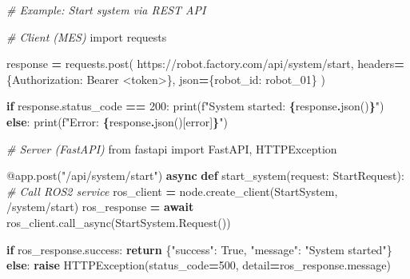 \documentclass[
]{article}
\newenvironment{Shaded}{\begin{snugshade}}{\end{snugshade}}
\newcommand{\AttributeTok}[1]{\textcolor[rgb]{0.13,0.29,0.53}{#1}}
\newcommand{\BuiltInTok}[1]{#1}
\newcommand{\CommentTok}[1]{\textcolor[rgb]{0.56,0.35,0.01}{\textit{#1}}}
\newcommand{\ControlFlowTok}[1]{\textcolor[rgb]{0.13,0.29,0.53}{\textbf{#1}}}
\newcommand{\DecValTok}[1]{\textcolor[rgb]{0.00,0.00,0.81}{#1}}
\newcommand{\ImportTok}[1]{#1}
\newcommand{\KeywordTok}[1]{\textcolor[rgb]{0.13,0.29,0.53}{\textbf{#1}}}
\newcommand{\NormalTok}[1]{#1}
\newcommand{\OperatorTok}[1]{\textcolor[rgb]{0.81,0.36,0.00}{\textbf{#1}}}
\newcommand{\SpecialCharTok}[1]{\textcolor[rgb]{0.81,0.36,0.00}{\textbf{#1}}}
\newcommand{\SpecialStringTok}[1]{\textcolor[rgb]{0.31,0.60,0.02}{#1}}
\newcommand{\StringTok}[1]{\textcolor[rgb]{0.31,0.60,0.02}{#1}}
\newcommand{\VariableTok}[1]{\textcolor[rgb]{0.00,0.00,0.00}{#1}}
\begin{document}
\begin{Shaded}
\begin{Highlighting}[]
\CommentTok{\# Example: Start system via REST API}

\CommentTok{\# Client (MES)}
\ImportTok{import}\NormalTok{ requests}

\NormalTok{response }\OperatorTok{=}\NormalTok{ requests.post(}
    \StringTok{\textquotesingle{}https://robot.factory.com/api/system/start\textquotesingle{}}\NormalTok{,}
\NormalTok{    headers}\OperatorTok{=}\NormalTok{\{}\StringTok{\textquotesingle{}Authorization\textquotesingle{}}\NormalTok{: }\StringTok{\textquotesingle{}Bearer \textless{}token\textgreater{}\textquotesingle{}}\NormalTok{\},}
\NormalTok{    json}\OperatorTok{=}\NormalTok{\{}\StringTok{\textquotesingle{}robot\_id\textquotesingle{}}\NormalTok{: }\StringTok{\textquotesingle{}robot\_01\textquotesingle{}}\NormalTok{\}}
\NormalTok{)}

\ControlFlowTok{if}\NormalTok{ response.status\_code }\OperatorTok{==} \DecValTok{200}\NormalTok{:}
    \BuiltInTok{print}\NormalTok{(}\SpecialStringTok{f"System started: }\SpecialCharTok{\{}\NormalTok{response}\SpecialCharTok{.}\NormalTok{json()}\SpecialCharTok{\}}\SpecialStringTok{"}\NormalTok{)}
\ControlFlowTok{else}\NormalTok{:}
    \BuiltInTok{print}\NormalTok{(}\SpecialStringTok{f"Error: }\SpecialCharTok{\{}\NormalTok{response}\SpecialCharTok{.}\NormalTok{json()[}\StringTok{\textquotesingle{}error\textquotesingle{}}\NormalTok{]}\SpecialCharTok{\}}\SpecialStringTok{"}\NormalTok{)}

\CommentTok{\# Server (FastAPI)}
\ImportTok{from}\NormalTok{ fastapi }\ImportTok{import}\NormalTok{ FastAPI, HTTPException}

\AttributeTok{@app.post}\NormalTok{(}\StringTok{"/api/system/start"}\NormalTok{)}
\ControlFlowTok{async} \KeywordTok{def}\NormalTok{ start\_system(request: StartRequest):}
    \CommentTok{\# Call ROS2 service}
\NormalTok{    ros\_client }\OperatorTok{=}\NormalTok{ node.create\_client(StartSystem, }\StringTok{\textquotesingle{}/system/start\textquotesingle{}}\NormalTok{)}
\NormalTok{    ros\_response }\OperatorTok{=} \ControlFlowTok{await}\NormalTok{ ros\_client.call\_async(StartSystem.Request())}

    \ControlFlowTok{if}\NormalTok{ ros\_response.success:}
        \ControlFlowTok{return}\NormalTok{ \{}\StringTok{"success"}\NormalTok{: }\VariableTok{True}\NormalTok{, }\StringTok{"message"}\NormalTok{: }\StringTok{"System started"}\NormalTok{\}}
    \ControlFlowTok{else}\NormalTok{:}
        \ControlFlowTok{raise}\NormalTok{ HTTPException(status\_code}\OperatorTok{=}\DecValTok{500}\NormalTok{, detail}\OperatorTok{=}\NormalTok{ros\_response.message)}
\end{Highlighting}
\end{Shaded}
\end{document}
